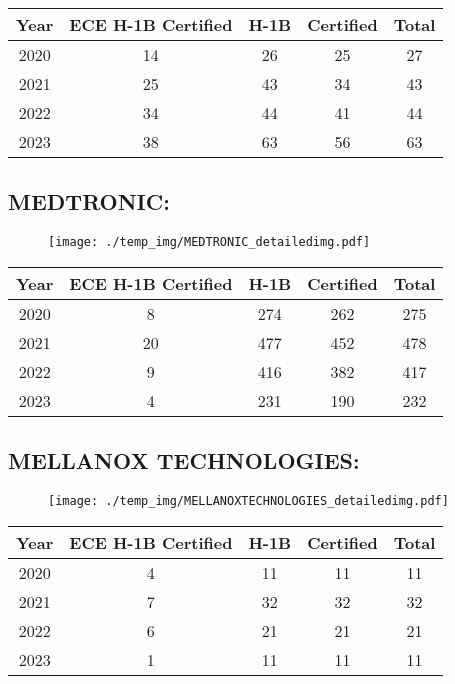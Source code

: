 \documentclass{article}%
\begin{document}
%
\begin{longtable}{c|c|c|c|c}%
\hline%
Year&ECE H{-}1B Certified&H{-}1B&Certified&Total\\%
\hline%
2020&14&26&25&27\\%
\hline%
2021&25&43&34&43\\%
\hline%
2022&34&44&41&44\\%
\hline%
2023&38&63&56&63\\%
\hline%
\end{longtable}

%
\newpage%
\subsection{MEDTRONIC:}%
\label{subsec:MEDTRONIC}%
\label{MEDTRONICdetailed}%


\begin{figure}[htbp]%
\centering%
\texttt{[image: ./temp\_img/MEDTRONIC\_detailedimg.pdf]}%
\end{figure}

%
\begin{longtable}{c|c|c|c|c}%
\hline%
Year&ECE H{-}1B Certified&H{-}1B&Certified&Total\\%
\hline%
2020&8&274&262&275\\%
\hline%
2021&20&477&452&478\\%
\hline%
2022&9&416&382&417\\%
\hline%
2023&4&231&190&232\\%
\hline%
\end{longtable}

%
\newpage%
\subsection{MELLANOX TECHNOLOGIES:}%
\label{subsec:MELLANOXTECHNOLOGIES}%
\label{MELLANOXTECHNOLOGIESdetailed}%


\begin{figure}[htbp]%
\centering%
\texttt{[image: ./temp\_img/MELLANOXTECHNOLOGIES\_detailedimg.pdf]}%
\end{figure}

%
\begin{longtable}{c|c|c|c|c}%
\hline%
Year&ECE H{-}1B Certified&H{-}1B&Certified&Total\\%
\hline%
2020&4&11&11&11\\%
\hline%
2021&7&32&32&32\\%
\hline%
2022&6&21&21&21\\%
\hline%
2023&1&11&11&11\\%
\hline%
\end{longtable}
\end{document}
